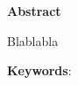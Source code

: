 
\begin{center}

\textbf{}

\vspace{2cm}

\Large{\textbf{Abstract}}

\end{center}

\vspace{1cm}

Blablabla

\vspace{1cm}

\textbf{Keywords}: 

\vspace{3cm}


